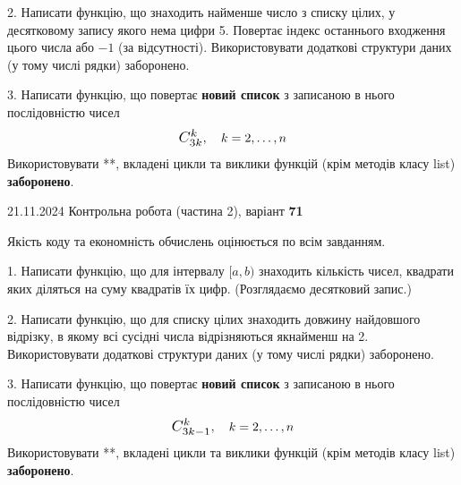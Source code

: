 \documentclass[12pt, ukrainian]{article}
\begin{document}
{{{{{{{{{{{\begin {large}

2. Написати функцію, що знаходить найменше число з списку цілих, у десятковому запису якого нема цифри 5. Повертає індекс останнього входження цього числа або $-1$ (за відсутності). Використовувати додаткові структури даних (у тому числі рядки) заборонено.

\vspace{10mm}


3. 
Написати функцію, що повертає \textbf{новий список} з записаною в нього послідовністю чисел
$$\scalebox{1.2}{$C_{3k}^{k}$}, \quad k=2,\ldots,n$$
Використовувати **, вкладені цикли та виклики функцій (крім методів класу list) \textbf{заборонено}.

\end{large}
\vspace{25mm}


{{21.11.2024 Контрольна робота  (частина 2), варіант  \No \textbf { 71 }\par}}


{
\begin {large}
Якість коду та економність обчислень оцінюється по всім завданням.

\vspace{5mm}

1. Написати функцію, що для інтервалу $[a, b)$ знаходить кількість чисел, квадрати яких діляться на суму квадратів їх цифр. (Розглядаємо десятковий запис.)

\vspace{10mm}


2. Написати функцію, що для списку цілих знаходить довжину найдовшого відрізку, в якому всі сусідні числа відрізняються якнайменш на 2. Використовувати додаткові структури даних (у тому числі рядки) заборонено.

\vspace{10mm}


3. 
Написати функцію, що повертає \textbf{новий список} з записаною в нього послідовністю чисел
$$\scalebox{1.2}{$C_{3k-1}^{k}$}, \quad k=2,\ldots,n$$
Використовувати **, вкладені цикли та виклики функцій (крім методів класу list) \textbf{заборонено}.


\end{large}}}}}}}}}}}}}
\end{document}
